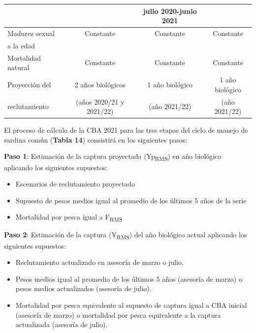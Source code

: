 \documentclass[
  spanish,
]{article}
\providecommand{\tightlist}{%
  \setlength{\itemsep}{0pt}\setlength{\parskip}{0pt}}
\begin{document}
\begin{table}[h]
{\begin{tabular}{|l|c|c|c|}
                    &                          & julio 2020-junio 2021           & \\ \hline
  Madurez sexual    & Constante                & Constante                       & Constante \\
  a la edad         &                          &                                 & \\ \hline
  Mortalidad natural& Constante                & Constante                       & Constante \\ \hline
  Proyección del    & 2 años biológicos        & 1 año biológico                 & 1 año biológico \\
  reclutamiento     & (años 2020/21 y 2021/22) & (año 2021/22)                   & (año 2021/22) \\ \hline
    \end{tabular}}
        \end{table}

\vspace{0.2cm}

\normalsize

El proceso de cálculo de la CBA 2021 para las tres etapas del ciclo de
manejo de sardina común (\textbf{Tabla 14}) consistirá en los siguientes
pasos:

\textbf{Paso 1}: Estimación de la captura proyectada
(Yp\textsubscript{RMS}) en año biológico aplicando los siguientes
supuestos:

\begin{itemize}
\tightlist
\item
  Escenarios de reclutamiento proyectado
\item
  Supuesto de pesos medios igual al promedio de los últimos 5 años de la
  serie
\item
  Mortalidad por pesca igual a F\textsubscript{RMS}
\end{itemize}

\textbf{Paso 2}: Estimación de la captura (Y\textsubscript{RMS}) del año
biológico actual aplicando los siguientes supuestos:

\begin{itemize}
\tightlist
\item
  Reclutamiento actualizado en asesoría de marzo o julio.
\item
  Pesos medios igual al promedio de los últimos 5 años (asesoría de
  marzo) o pesos medios actualizados (asesoría de julio).
\item
  Mortalidad por pesca equivalente al supuesto de captura igual a CBA
  inicial (asesoría de marzo) o mortalidad por pesca equivalente a la
  captura actualizada (asesoría de julio).
\end{itemize}
\end{document}
